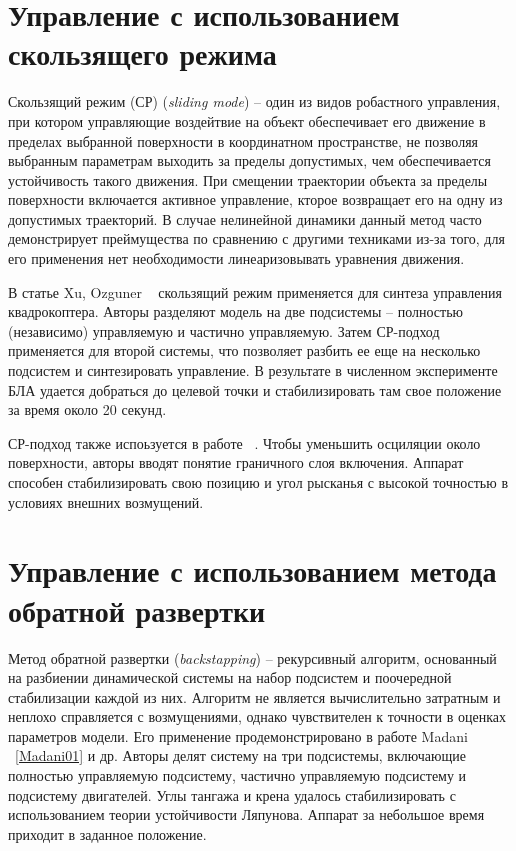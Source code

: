 \documentclass[a4paper,14pt,oneside,openany]{memoir}
\begin{document}
	\section{Управление с использованием скользящего режима}
	
	Скользящий режим (СР) (\textit{sliding mode}) -- один из видов робастного управления, при котором управляющие воздейтвие на объект обеспечивает его движение в пределах выбранной поверхности в координатном пространстве, не позволяя выбранным параметрам выходить за пределы допустимых, чем обеспечивается устойчивость такого движения. При смещении траектории объекта за пределы поверхности включается активное управление, кторое возвращает его на одну из допустимых траекторий. В случае нелинейной динамики данный метод часто демонстрирует преймущества по сравнению с другими техниками из-за того, для его применения нет необходимости линеаризовывать уравнения движения.
	
	В статье Xu, Ozguner ~\cite{Xu01} скользящий режим применяется для синтеза управления квадрокоптера. Авторы разделяют модель на две подсистемы -- полностью (независимо) управляемую и частично управляемую. Затем СР-подход применяется для второй системы, что позволяет разбить ее еще на несколько подсистем и синтезировать управление. В результате в численном эксперименте БЛА удается добраться до целевой точки и стабилизировать там свое положение за время около 20 секунд.
	
	СР-подход также испоьзуется в работе ~\cite{Runcharoon01}. Чтобы уменьшить осциляции около поверхности, авторы вводят понятие граничного слоя включения. Аппарат способен стабилизировать свою позицию и угол рысканья с высокой точностью в условиях внешних возмущений.
	
	\section{Управление с использованием метода обратной развертки}
	Метод обратной развертки (\textit{backstapping}) -- рекурсивный алгоритм, основанный на разбиении динамической системы на набор подсистем и поочередной стабилизации каждой из них. Алгоритм не является вычислительно затратным и неплохо справляется с возмущениями, однако чувствителен к точности в оценках параметров модели. Его применение продемонстрировано в работе Madani ~\ref{Madani01} и др. Авторы делят систему на три подсистемы, включающие полностью управляемую подсистему, частично управляемую подсистему и подсистему двигателей. Углы тангажа и крена удалось стабилизировать с использованием теории устойчивости Ляпунова. Аппарат за небольшое время приходит в заданное положение.
	
	{}
	
\end{document}
